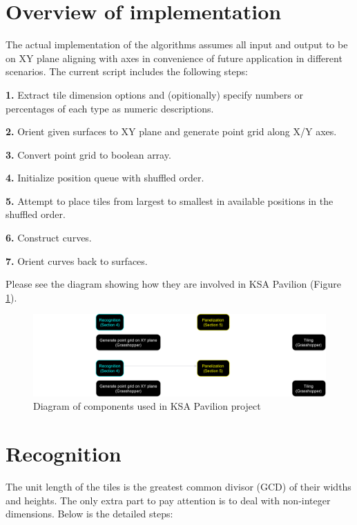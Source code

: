 \documentclass{article}
\begin{document}
\FloatBarrier

\section{Overview of implementation}

The actual implementation of the algorithms assumes all input and output to be on XY plane aligning with axes in convenience of future application in different scenarios. The current script includes the following steps:

\textbf{1.} Extract tile dimension options and (opitionally) specify numbers or percentages of each type as numeric descriptions.

\textbf{2.} Orient given surfaces to XY plane and generate point grid along X/Y axes.

\textbf{3.} Convert point grid to boolean array.

\textbf{4.} Initialize position queue with shuffled order.

\textbf{5.} Attempt to place tiles from largest to smallest in available positions in the shuffled order.

\textbf{6.} Construct curves.

\textbf{7.} Orient curves back to surfaces.

Please see the diagram showing how they are involved in KSA Pavilion (Figure \ref{diagram}).

\begin{figure}[hbt!]
	\centering
	\includegraphics[width=1\textwidth]{Figures/Diagram.png}
	\caption{Diagram of components used in KSA Pavilion project}
	\label{diagram}
\end{figure}

\section{Recognition}

The unit length of the tiles is the greatest common divisor (GCD) of their widths and heights. The only extra part to pay attention is to deal with non-integer dimensions. Below is the detailed steps:
\end{document}
